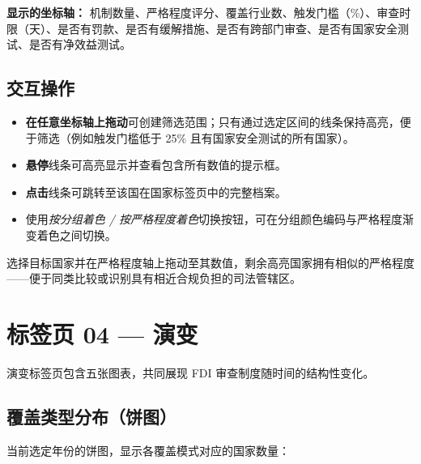 \documentclass[12pt,a4paper]{article}
\newcommand{\badge}[2]{%
  \colorbox{#1}{\color{white}\footnotesize\textbf{\strut\,#2\,}}%
}
\newcommand{\uielem}[1]{\textit{#1}}
\begin{document}
\textbf{显示的坐标轴：}
机制数量、严格程度评分、覆盖行业数、触发门槛（\%）、审查时限（天）、是否有罚款、是否有缓解措施、是否有跨部门审查、是否有国家安全测试、是否有净效益测试。

\subsection{交互操作}

\begin{itemize}
  \item \textbf{在任意坐标轴上拖动}可创建筛选范围；只有通过选定区间的线条保持高亮，便于筛选（例如触发门槛低于 25\% 且有国家安全测试的所有国家）。
  \item \textbf{悬停}线条可高亮显示并查看包含所有数值的提示框。
  \item \textbf{点击}线条可跳转至该国在国家标签页中的完整档案。
  \item 使用\uielem{按分组着色 / 按严格程度着色}切换按钮，可在分组颜色编码与严格程度渐变着色之间切换。
\end{itemize}

\begin{tipbox}[典型使用场景]
选择目标国家并在严格程度轴上拖动至其数值，剩余高亮国家拥有相似的严格程度——便于同类比较或识别具有相近合规负担的司法管辖区。
\end{tipbox}

\section{标签页 04 — 演变}
\label{sec:evolution}

演变标签页包含五张图表，共同展现 FDI 审查制度随时间的结构性变化。

\subsection{覆盖类型分布（饼图）}

当前选定年份的饼图，显示各覆盖模式对应的国家数量：

\end{document}
